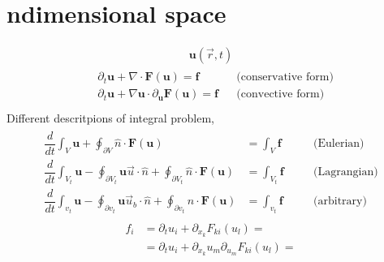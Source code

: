 \documentclass[letterpaper,10pt,english]{jupyterBook}
\begin{document}
\section{n\sphinxhyphen{}dimensional space}
\label{\detokenize{ch/pde/hyperbolic:n-dimensional-space}}\begin{equation*}
\begin{split}\mathbf{u}(\vec{r}, t)\end{split}
\end{equation*}\begin{equation*}
\begin{split}\begin{aligned}
  & \partial_t \mathbf{u} + \nabla \cdot \mathbf{F}(\mathbf{u}) = \mathbf{f}  && \text{(conservative form)} \\
  & \partial_t \mathbf{u} + \nabla \mathbf{u} \cdot \partial_{\mathbf{u}} \mathbf{F}(\mathbf{u}) = \mathbf{f}  && \text{(convective form)} \\
\end{aligned}\end{split}
\end{equation*}
\sphinxAtStartPar
Different descritpions of integral problem,
\begin{equation*}
\begin{split}\begin{aligned}
  \dfrac{d}{dt} \int_V \mathbf{u} + \oint_{\partial V} \hat{n} \cdot \mathbf{F}(\mathbf{u}) & = \int_V \mathbf{f} && \quad \text{(Eulerian)} \\
  \dfrac{d}{dt} \int_{V_t} \mathbf{u} - \oint_{\partial V_t} \mathbf{u} \vec{u} \cdot \hat{n} + \oint_{\partial V_t} \hat{n} \cdot \mathbf{F}(\mathbf{u}) & = \int_{V_t} \mathbf{f} && \quad \text{(Lagrangian)} \\
  \dfrac{d}{dt} \int_{v_t} \mathbf{u} - \oint_{\partial v_t} \mathbf{u} \vec{u}_b \cdot \hat{n} + \oint_{\partial v_t} \hat{n} \cdot \mathbf{F}(\mathbf{u}) & = \int_{v_t} \mathbf{f} && \quad \text{(arbitrary)}
\end{aligned}\end{split}
\end{equation*}
\sphinxAtStartPar
{} 
\begin{equation*}
\begin{split}\begin{aligned} 
  f_i
  & = \partial_t u_i + \partial_{x_k} F_{ki} (u_l) = \\
  & = \partial_t u_i + \partial_{x_k} u_m \partial_{u_m} F_{ki} (u_l) = \\
\end{aligned}\end{split}
\end{equation*}\label{ch/pde/hyperbolic:example-4}
\end{document}
